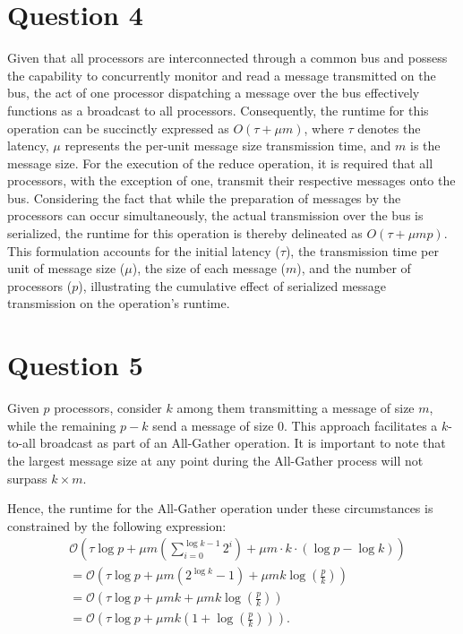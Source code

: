 \documentclass{article}
\begin{document}
\section{Question 4}

Given that all processors are interconnected through a common bus and possess the capability to concurrently monitor and read a message transmitted on the bus, the act of one processor dispatching a message over the bus effectively functions as a broadcast to all processors. Consequently, the runtime for this operation can be succinctly expressed as \(O(\tau + \mu m)\), where \(\tau\) denotes the latency, \(\mu\) represents the per-unit message size transmission time, and \(m\) is the message size. For the execution of the reduce operation, it is required that all processors, with the exception of one, transmit their respective messages onto the bus. Considering the fact that while the preparation of messages by the processors can occur simultaneously, the actual transmission over the bus is serialized, the runtime for this operation is thereby delineated as \(O(\tau + \mu m p)\). This formulation accounts for the initial latency (\(\tau\)), the transmission time per unit of message size (\(\mu\)), the size of each message (\(m\)), and the number of processors (\(p\)), illustrating the cumulative effect of serialized message transmission on the operation's runtime.

\section{Question 5}
Given $p$ processors, consider $k$ among them transmitting a message of size $m$, while the remaining $p-k$ send a message of size $0$. This approach facilitates a $k$-to-all broadcast as part of an All-Gather operation. It is important to note that the largest message size at any point during the All-Gather process will not surpass $k \times m$.

Hence, the runtime for the All-Gather operation under these circumstances is constrained by the following expression:
\begin{equation*}
\begin{aligned}
& \mathcal{O}\left(\tau \log p + \mu m \left(\sum_{i=0}^{\log k - 1} 2^i\right) + \mu m \cdot k \cdot (\log p - \log k)\right) \\
&= \mathcal{O}\left(\tau \log p + \mu m (2^{\log k} - 1) + \mu m k \log \left(\frac{p}{k}\right)\right) \\
&= \mathcal{O}\left(\tau \log p + \mu m k + \mu m k \log \left(\frac{p}{k}\right)\right) \\
&= \mathcal{O}\left(\tau \log p + \mu m k \left(1 + \log \left(\frac{p}{k}\right)\right)\right).
\end{aligned}
\end{equation*}
\end{document}
